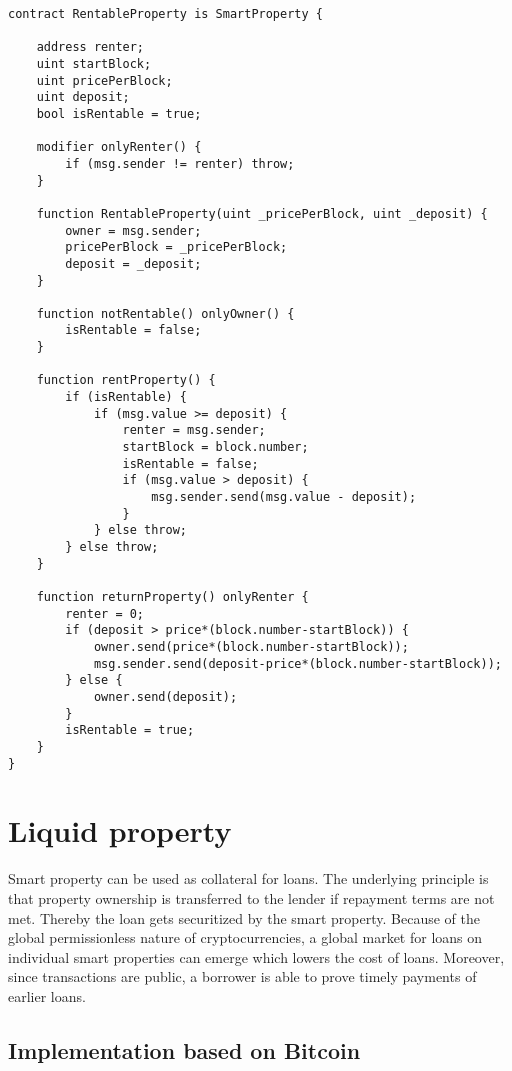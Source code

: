 {\begin{lstlisting}[breaklines,basicstyle=\tiny]
contract RentableProperty is SmartProperty {
    
    address renter;
    uint startBlock;
    uint pricePerBlock;
    uint deposit;
    bool isRentable = true;
    
    modifier onlyRenter() {
        if (msg.sender != renter) throw;
    } 
    
    function RentableProperty(uint _pricePerBlock, uint _deposit) {
        owner = msg.sender;
        pricePerBlock = _pricePerBlock;
        deposit = _deposit;
    }
    
    function notRentable() onlyOwner() {
        isRentable = false;
    }
    
    function rentProperty() {
        if (isRentable) {
            if (msg.value >= deposit) {
                renter = msg.sender;
                startBlock = block.number;
                isRentable = false;
                if (msg.value > deposit) {
                    msg.sender.send(msg.value - deposit);
                }
            } else throw;
        } else throw;
    }
    
    function returnProperty() onlyRenter {
        renter = 0;
        if (deposit > price*(block.number-startBlock)) {
            owner.send(price*(block.number-startBlock));
            msg.sender.send(deposit-price*(block.number-startBlock));
        } else {
            owner.send(deposit);
        }
        isRentable = true;
    }
}
\end{lstlisting}

\section{Liquid property}

Smart property can be used as collateral for loans. The underlying principle is that property ownership is transferred to the lender if repayment terms are not met. Thereby the loan gets securitized by the smart property. Because of the global permissionless nature of cryptocurrencies, a global market for loans on individual smart properties can emerge which lowers the cost of loans. Moreover, since transactions are public, a borrower is able to prove timely payments of earlier loans. 

\subsection{Implementation based on Bitcoin}

}
